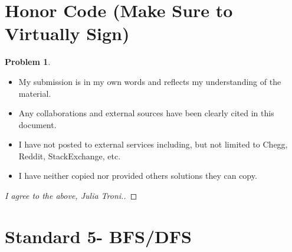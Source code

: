 \documentclass[11pt]{article}
\theoremstyle{definition}
\theoremstyle{definition}
\newtheorem{required}{Problem}
\theoremstyle{definition}
\begin{document}
\section{Honor Code (Make Sure to Virtually Sign)} \label{HonorCode}

\begin{required}
\begin{itemize}
\item My submission is in my own words and reflects my understanding of the material.
\item Any collaborations and external sources have been clearly cited in this document.
\item I have not posted to external services including, but not limited to Chegg, Reddit, StackExchange, etc.
\item I have neither copied nor provided others solutions they can copy.
\end{itemize}

\end{required}

\begin{proof}[I agree to the above, Julia Troni.]
\end{proof}


\newpage
\section{Standard 5- BFS/DFS}
\end{document}
